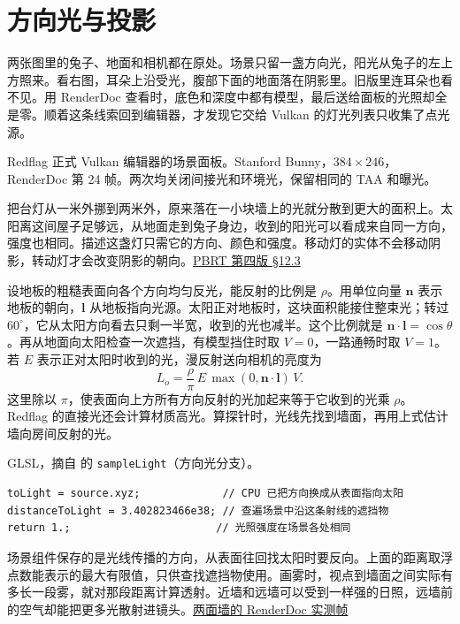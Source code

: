 \clearpage
\section{方向光与投影}

两张图里的兔子、地面和相机都在原处。场景只留一盏方向光，阳光从兔子的左上方照来。看右图，耳朵上沿受光，腹部下面的地面落在阴影里。旧版里连耳朵也看不见。用 RenderDoc 查看时，底色和深度中都有模型，最后送给面板的光照却全是零。顺着这条线索回到编辑器，才发现它交给 Vulkan 的灯光列表只收集了点光源。

{\small\color{quiet}Redflag 正式 Vulkan 编辑器的场景面板。Stanford Bunny，$384\times246$，RenderDoc 第 24 帧。两次均关闭间接光和环境光，保留相同的 TAA 和曝光。}

把台灯从一米外挪到两米外，原来落在一小块墙上的光就分散到更大的面积上。太阳离这间屋子足够远，从地面走到兔子身边，收到的阳光可以看成来自同一方向，强度也相同。描述这盏灯只需它的方向、颜色和强度。移动灯的实体不会移动阴影，转动灯才会改变阴影的朝向。\href{https://pbr-book.org/4ed/Light_Sources/Distant_Lights}{PBRT 第四版 §12.3}

设地板的粗糙表面向各个方向均匀反光，能反射的比例是 $\rho$。用单位向量 $\mathbf n$ 表示地板的朝向，$\mathbf l$ 从地板指向光源。太阳正对地板时，这块面积能接住整束光；转过 $60^\circ$，它从太阳方向看去只剩一半宽，收到的光也减半。这个比例就是 $\mathbf n\cdot\mathbf l=\cos\theta$。再从地面向太阳检查一次遮挡，有模型挡住时取 $V=0$，一路通畅时取 $V=1$。若 $E$ 表示正对太阳时收到的光，漫反射送向相机的亮度为
\[
 L_o=\frac{\rho}{\pi}\,E\,\max(0,\mathbf n\cdot\mathbf l)\,V .
\]
这里除以 $\pi$，使表面向上方所有方向反射的光加起来等于它收到的光乘 $\rho$。Redflag 的直接光还会计算材质高光。算探针时，光线先找到墙面，再用上式估计墙向房间反射的光。

{\small GLSL，摘自  的 \texttt{sampleLight}（方向光分支）。}
\begin{lstlisting}
toLight = source.xyz;             // CPU 已把方向换成从表面指向太阳
distanceToLight = 3.402823466e38; // 查遍场景中沿这条射线的遮挡物
return 1.;                       // 光照强度在场景各处相同
\end{lstlisting}
场景组件保存的是光线传播的方向，从表面往回找太阳时要反向。上面的距离取浮点数能表示的最大有限值，只供查找遮挡物使用。画雾时，视点到墙面之间实际有多长一段雾，就对那段距离计算透射。近墙和远墙可以受到一样强的日照，远墙前的空气却能把更多光散射进镜头。\href{run:../validation/directional/DirectionalLight_capture.rdc}{两面墙的 RenderDoc 实测帧}
